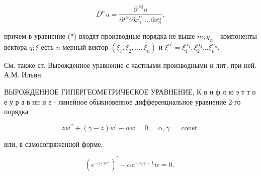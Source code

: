 \documentclass[10pt]{article}
\begin{document}
\[

D^{\alpha} u=\frac{\partial^{|\alpha|} u}{\partial t^{\alpha_{0}} \partial x_{1}^{\alpha_{1}} \ldots \partial x_{n}^{\alpha}},

\]



причем в уравнение (*) входят производные порядка не выше $m ; q_{\alpha}$ - компоненты вектора $q ; \xi$ есть $n$-мерный вектор $\left(\xi_{1}, \xi_{2}, \ldots, \xi_{n}\right)$ и $\xi^{\alpha^{\prime}}=\xi_{1}^{\alpha_{1}}, \xi_{2}^{\alpha_{2}} \ldots \xi_{n}^{\alpha_{n}}$.



См. также ст. Вырожденное уравнение с частными производными и лит. при ней. $А . М$. Ильин.



ВЫРОЖДЕННОЕ ГИПЕРГЕОМЕТРИЧЕСКОЕ УРАВНЕНИЕ, К о н ф л ю э т т о е у р а в нн и е - линейное обыкновенное дифференциальное уравнение 2-го порядка



\[

z w^{\prime \prime}+(\gamma-z) w^{\prime}-\alpha w=0, \quad \alpha, \gamma=\text { const }

\]



или, в самосопряженной форме,



\[

\left(e^{-z_{z} \gamma w^{\prime}}\right)^{\prime}-\alpha e^{-z_{z} \gamma-1} w=0 \text {. }

\]
\end{document}
